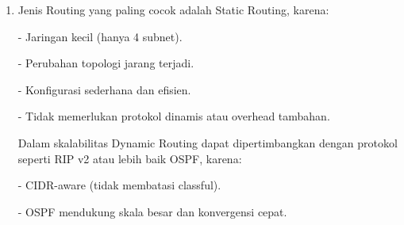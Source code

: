 \begin{enumerate}
	\item Jenis Routing yang paling cocok adalah Static Routing, karena:
	
	- Jaringan kecil (hanya 4 subnet).
	
	- Perubahan topologi jarang terjadi.
	
	- Konfigurasi sederhana dan efisien.
	
	- Tidak memerlukan protokol dinamis atau overhead tambahan.
	
	Dalam skalabilitas Dynamic Routing dapat dipertimbangkan dengan protokol seperti RIP v2 atau lebih baik OSPF, karena:
	
	- CIDR-aware (tidak membatasi classful).
	
	- OSPF mendukung skala besar dan konvergensi cepat.
\end{enumerate}